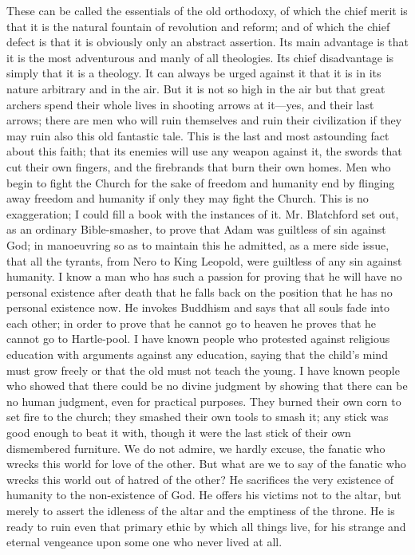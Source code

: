 These can be called the essentials of the old orthodoxy, of which the chief merit is that it is the natural fountain of revolution and reform; and of which the chief defect is that it is obviously only an abstract assertion. Its main advantage is that it is the most adventurous and manly of all theologies. Its chief disadvantage is simply that it is a theology. It can always be urged against it that it is in its nature arbitrary and in the air. But it is not so high in the air but that great archers spend their whole lives in shooting arrows at it—yes, and their last arrows; there are men who will ruin themselves and ruin their civilization if they may ruin also this old fantastic tale. This is the last and most astounding fact about this faith; that its enemies will use any weapon against it, the swords that cut their own fingers, and the firebrands that burn their own homes. Men who begin to fight the Church for the sake of freedom and humanity end by flinging away freedom and humanity if only they may fight the Church. This is no exaggeration; I could fill a book with the instances of it. Mr. Blatchford set out, as an ordinary Bible-smasher, to prove that Adam was guiltless of sin against God; in manoeuvring so as to maintain this he admitted, as a mere side issue, that all the tyrants, from Nero to King Leopold, were guiltless of any sin against humanity. I know a man who has such a passion for proving that he will have no personal existence after death that he falls back on the position that he has no personal existence now. He invokes Buddhism and says that all souls fade into each other; in order to prove that he cannot go to heaven he proves that he cannot go to Hartle-pool. I have known people who protested against religious education with arguments against any education, saying that the child’s mind must grow freely or that the old must not teach the young. I have known people who showed that there could be no divine judgment by showing that there can be no human judgment, even for practical purposes. They burned their own corn to set fire to the church; they smashed their own tools to smash it; any stick was good enough to beat it with, though it were the last stick of their own dismembered furniture. We do not admire, we hardly excuse, the fanatic who wrecks this world for love of the other. But what are we to say of the fanatic who wrecks this world out of hatred of the other? He sacrifices the very existence of humanity to the non-existence of God. He offers his victims not to the altar, but merely to assert the idleness of the altar and the emptiness of the throne. He is ready to ruin even that primary ethic by which all things live, for his strange and eternal vengeance upon some one who never lived at all.

